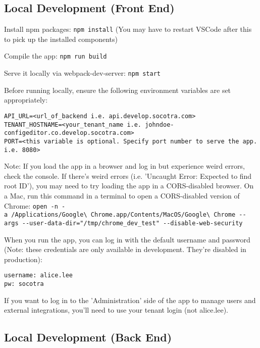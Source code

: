 \hypertarget{local-development-front-end}{%
\subsection{Local Development (Front
End)}\label{local-development-front-end}}

Install npm packages: \texttt{npm\ install} (You may have to restart
VSCode after this to pick up the installed components)

Compile the app: \texttt{npm\ run\ build}

Serve it locally via webpack-dev-server: \texttt{npm\ start}

Before running locally, ensure the following environment variables are
set appropriately:

\begin{verbatim}
API_URL=<url_of_backend i.e. api.develop.socotra.com>
TENANT_HOSTNAME=<your_tenant_name i.e. johndoe-configeditor.co.develop.socotra.com>
PORT=<this variable is optional. Specify port number to serve the app. i.e. 8080>
\end{verbatim}

Note: If you load the app in a browser and log in but experience weird
errors, check the console. If there's weird errors (i.e. 'Uncaught
Error: Expected to find root ID'), you may need to try loading the app
in a CORS-disabled browser. On a Mac, run this command in a terminal to
open a CORS-disabled version of Chrome:
\texttt{open\ -n\ -a\ /Applications/Google\textbackslash{}\ Chrome.app/Contents/MacOS/Google\textbackslash{}\ Chrome\ -\/-args\ -\/-user-data-dir="/tmp/chrome\_dev\_test"\ -\/-disable-web-security}

When you run the app, you can log in with the default username and
password (Note: these credentials are only available in development.
They're disabled in production):

\begin{verbatim}
username: alice.lee
pw: socotra
\end{verbatim}

If you want to log in to the 'Administration' side of the app to manage
users and external integrations, you'll need to use your tenant login
(not alice.lee).

\hypertarget{local-development-back-end}{%
\subsection{Local Development (Back
End)}\label{local-development-back-end}}

